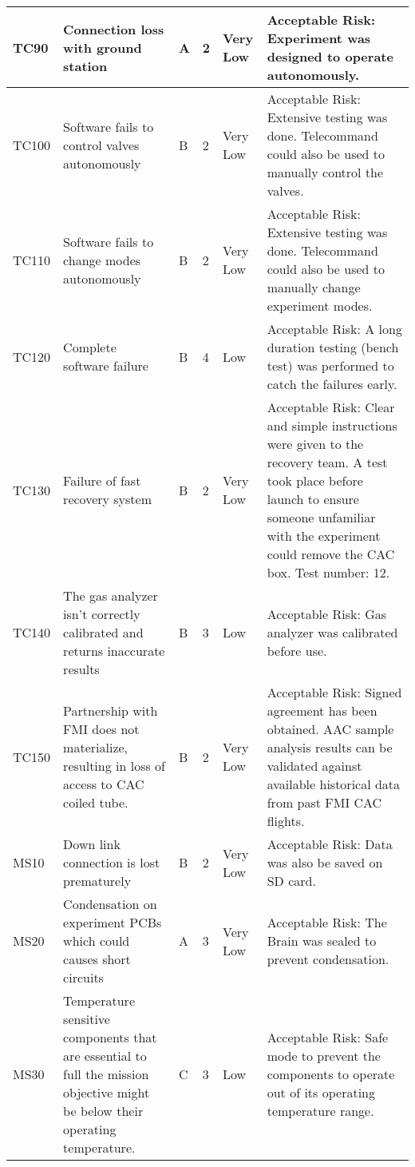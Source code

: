 \begin{longtable}{|m{}| m{} |m{} |m{}|m{}| m{}|}
TC90 & Connection loss with ground station & A & 2 & \cellcolor[HTML]{34FF34}Very Low & Acceptable Risk: Experiment was designed to operate autonomously. \\ \hline
TC100 & Software fails to control valves autonomously & B & 2 & \cellcolor[HTML]{34FF34}Very Low & Acceptable Risk: Extensive testing was done. Telecommand could also be used to manually control the valves. \\ \hline
TC110 & Software fails to change modes autonomously & B & 2 & \cellcolor[HTML]{34FF34}Very Low & Acceptable Risk: Extensive testing was done. Telecommand could also be used to manually change experiment modes. \\ \hline
TC120 & Complete software failure & B & 4 & \cellcolor[HTML]{FCFF2F}Low & Acceptable Risk: A long duration testing (bench test) was performed to catch the failures early. \\ \hline
TC130 & Failure of fast recovery system & B & 2 & \cellcolor[HTML]{34FF34}Very Low & Acceptable Risk: Clear and simple instructions were given to the recovery team. A test took place before launch to ensure someone unfamiliar with the experiment could remove the CAC box. Test number: 12. \\ \hline
TC140 & The gas analyzer isn't correctly calibrated and returns inaccurate results & B & 3 & \cellcolor[HTML]{FCFF2F}Low & Acceptable Risk: Gas analyzer was calibrated before use.\\ \hline 
TC150 & Partnership with FMI does not materialize, resulting in loss of access to CAC coiled tube. & B & 2 & \cellcolor[HTML]{34FF34}Very Low & Acceptable Risk: Signed agreement has been obtained. AAC sample analysis results can be validated against available historical data from past FMI CAC flights. \\ \hline 
MS10 & Down link connection is lost prematurely & B & 2 & \cellcolor[HTML]{34FF34}Very Low & Acceptable Risk: Data was also be saved on SD card. \\ \hline
MS20 & Condensation on experiment PCBs which could causes short circuits & A & 3 & \cellcolor[HTML]{34FF34}Very Low & Acceptable Risk: The Brain was sealed to prevent condensation. \\ \hline
MS30 & Temperature sensitive components that are essential to full the mission objective might be below their operating temperature. & C & 3 & \cellcolor[HTML]{FCFF2F}Low & Acceptable Risk: Safe mode to prevent the components to operate out of its operating temperature range. \\ \hline

\end{longtable}
